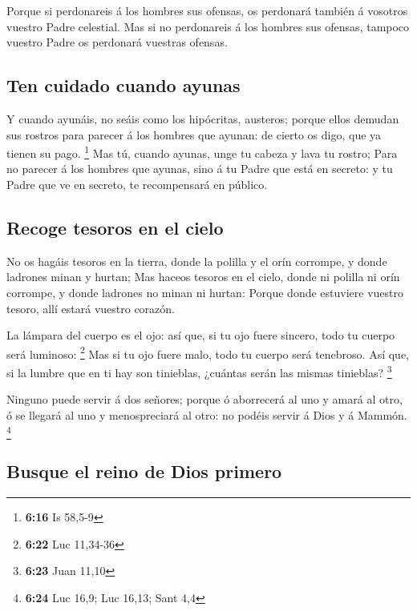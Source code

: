  Porque si perdonareis á los hombres sus ofensas, os
perdonará también á vosotros vuestro Padre celestial. 
Mas si no perdonareis á los hombres sus ofensas, tampoco vuestro Padre
os perdonará vuestras ofensas.

\hypertarget{ten-cuidado-cuando-ayunas}{%
\subsection{Ten cuidado cuando ayunas}\label{ten-cuidado-cuando-ayunas}}

 Y cuando ayunáis, no seáis como los hipócritas,
austeros; porque ellos demudan sus rostros para parecer á los hombres
que ayunan: de cierto os digo, que ya tienen su pago. \footnote{\textbf{6:16}
  Is 58,5-9}  Mas tú, cuando ayunas, unge tu cabeza y
lava tu rostro;  Para no parecer á los hombres que
ayunas, sino á tu Padre que está en secreto: y tu Padre que ve en
secreto, te recompensará en público.

\hypertarget{recoge-tesoros-en-el-cielo}{%
\subsection{Recoge tesoros en el
cielo}\label{recoge-tesoros-en-el-cielo}}

 No os hagáis tesoros en la tierra, donde la polilla y el
orín corrompe, y donde ladrones minan y hurtan;  Mas
haceos tesoros en el cielo, donde ni polilla ni orín corrompe, y donde
ladrones no minan ni hurtan:  Porque donde estuviere
vuestro tesoro, allí estará vuestro corazón.

 La lámpara del cuerpo es el ojo: así que, si tu ojo
fuere sincero, todo tu cuerpo será luminoso: \footnote{\textbf{6:22} Luc
  11,34-36}  Mas si tu ojo fuere malo, todo tu cuerpo
será tenebroso. Así que, si la lumbre que en ti hay son tinieblas,
¿cuántas serán las mismas tinieblas? \footnote{\textbf{6:23} Juan 11,10}

 Ninguno puede servir á dos señores; porque ó aborrecerá
al uno y amará al otro, ó se llegará al uno y menospreciará al otro: no
podéis servir á Dios y á Mammón. \footnote{\textbf{6:24} Luc 16,9; Luc
  16,13; Sant 4,4}

\hypertarget{busque-el-reino-de-dios-primero}{%
\subsection{Busque el reino de Dios
primero}\label{busque-el-reino-de-dios-primero}}


